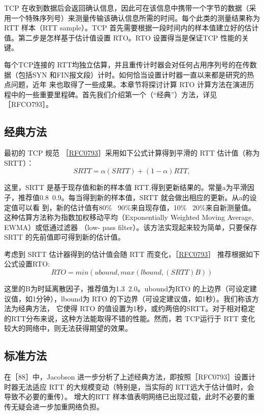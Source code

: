 TCP 在收到数据后会返回确认信息，因此可在该信息中携带一个字节的数据（采用一个特殊序列号）来测量传输该确认信息所需的时间。每个此类的测量结果称为 RTT 样本（RTT
sample）。TCP 首先需要根据一段时间内的样本值建立好的估计值。第二步是怎样基于估计值设置 RTO。RTO 设置得当是保证TCP 性能的关键。

每个TCP连接的 RTT均独立估算，并且重传计时器会对任何占用序列号的在传数据（包括SYN 和FIN报文段）计时。如何恰当设置计时器一直以来都是研究的热点问题，近年
来也取得了一些成果。本章节将探讨计算 RTO 计算方法在演进历程中的一些重要里程碑。首先我们介绍第一个（“经典”）方法，详见［RFCO793］。

\subsection{经典方法}
最初的 TCP 规范 ［\href{https://datatracker.ietf.org/doc/html/rfc0793#section-3.7}{RFC0793}］采用如下公式计算得到平滑的 RTT 估计值（称为 SRTT）：
\begin{equation}
    SRTT = \alpha(SRTT) + (1 - \alpha) RTT,
\end{equation}

这里，SRTT 是基于现存值和新的样本值 RTT.得到更新结果的。常量a为平滑因子，推荐值0.8~0.9。每当得到新的样本值，SRTT 就会做出相应的更新。从a的设定值可以看
到，新的估计值有80\% ~90\%来自现存值，10\% ~20\%来自新测量值。这种估算方法称为指数加权移动平均（Exponentially Weighted Moving Average, EWMA）或低通过滤器 （low-
pass filter）。该方法实现起来较为简单，只要保存SRTT 的先前值即可得到新的估计值。

考虑到 SRTT 估计器得到的估计值会随 RTT 而变化，［\href{https://datatracker.ietf.org/doc/html/rfc0793#section-3.7}{RFC0793}］ 推荐根据如下公式设置RTO:
\begin{equation}
    RTO = min(ubound, max(lbound, (SRTT)B))
\end{equation}

这里的B为时延离散因子，推荐值为1.3~2.0。ubound为RTO 的上边界（可设定建议值，如1分钟），lbound为 RTO 的下边界（可设定建议值，如1秒）。我们称该方法为经典方法，
它使得 RTO 的值设置为1秒，或约两倍的SRTT。对于相对稳定的RTT分布来说，这种方法能取得不错的性能。然而，若 TCP运行于 RTT 变化较大的网络中，则无法获得期望的效果。

\subsection{标准方法}
在［88］中，Jacobson 进一步分析了上述经典方法，即按照［RFC0793］设置计时器无法适应 RTT 的大规模变动（特别是，当实际的 RTT远大于估计值时，会导致不必要的重传）。
增大的RTT 样本值表明网络已出现过载，此时不必要的重传无疑会进一步加重网络负担。

